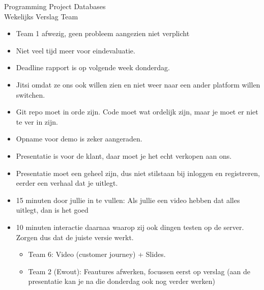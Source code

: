 \documentclass{article}
\newcounter{team}
\begin{document}

    \begin{Minutes}{Programming Project Databases \\ Wekelijks Verslag Team }
        \missingNoExcuse{/}
        \missingExcused{/}

        \maketitle

        \begin{itemize}
            \item Team 1 afwezig, geen probleem aangezien niet verplicht
            \item Niet veel tijd meer voor eindevaluatie.
            \item Deadline rapport is op volgende week donderdag.
            \item Jitsi omdat ze ons ook willen zien en niet weer naar een ander platform willen switchen.
            \item Git repo moet in orde zijn. Code moet wat ordelijk zijn, maar je moet er niet te ver in zijn.
            \item Opname voor demo is zeker aangeraden.
            \item Presentatie is voor de klant, daar moet je het echt verkopen aan ons.
            \item Presentatie moet een geheel zijn, dus niet stilstaan bij inloggen en registreren, eerder een verhaal dat je uitlegt.
            \item 15 minuten door jullie in te vullen: Als jullie een video hebben dat alles uitlegt, dan is het goed
            \item 10 minuten interactie daarnaa waarop zij ook dingen testen op de server. Zorgen dus dat de juiste versie werkt.
            \begin{itemize}
                \item Team 6: Video (customer journey) + Slides.
                \item Team 2 (Ewout): Feautures afwerken, focussen eerst op verslag (aan de presentatie kan je na die donderdag ook nog verder werken)

\end{itemize}
\end{itemize}
\end{Minutes}
\end{document}
